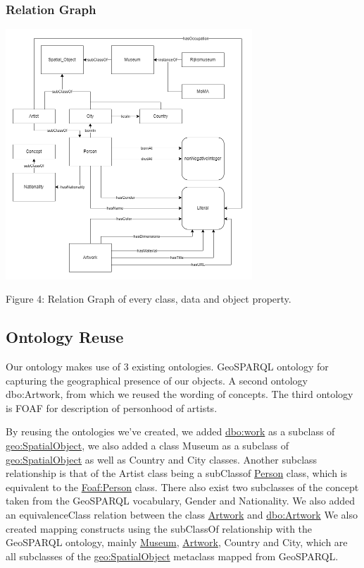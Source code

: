 \documentclass{article}
\begin{document}
\begin{center}
\subsubsection{Relation Graph}
\includegraphics[width=350]{Relation_Graph.png}
\newline
\caption{Figure 4: Relation Graph of every class, data and object property.}
\end{center}


\newpage
\subsection{Ontology Reuse}
Our ontology makes use of 3 existing ontologies. GeoSPARQL ontology for capturing the
geographical presence of our objects. A second ontology dbo:Artwork, from which we reused
the wording of concepts. The third ontology is FOAF for description of personhood of artists.

By reusing the ontologies we’ve created, we added \underline{dbo:work} as a subclass of \underline{geo:SpatialObject}, we
also added a class Museum as a subclass of \underline{geo:SpatialObject} as well as Country and City classes.
Another subclass relationship is that of the Artist class being a subClassof \underline{Person} class, which is
equivalent to the \underline{Foaf:Person} class. There also exist two subclasses of the concept taken from the
GeoSPARQL vocabulary, Gender and Nationality. We also added an equivalenceClass relation between the class \underline{Artwork} and \underline{dbo:Artwork}
We also created mapping constructs
using the subClassOf relationship with the GeoSPARQL ontology, mainly \underline{Museum}, \underline{Artwork},
Country and City, which are all subclasses of the \underline{geo:SpatialObject} metaclass mapped from
GeoSPARQL. 
\end{document}
